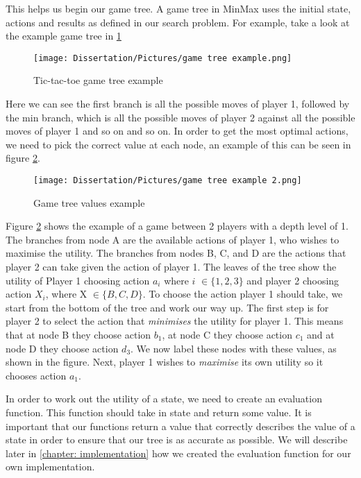 \documentclass[]{final_report}
\begin{document}
This helps us begin our game tree. A game tree in MinMax uses the initial state, actions and results as defined in our search problem. For example, take a look at the example game tree in \ref{fig:game tree example} 

\begin{figure}[!htp]
    \centering
    \texttt{[image: Dissertation/Pictures/game tree example.png]}
    \caption{Tic-tac-toe game tree example \cite{russell2016artificial}}
    \label{fig:game tree example}
\end{figure}

Here we can see the first branch is all the possible moves of player 1, followed by the min branch, which is all the possible moves of player 2 against all the possible moves of player 1 and so on and so on.  In order to get the most optimal actions, we need to pick the correct value at each node, an example of this can be seen in figure \ref{fig:game tree value example}.

\newpage
\begin{figure}[!htp]
    \centering
    \texttt{[image: Dissertation/Pictures/game tree example 2.png]}
    \caption{Game tree values example \cite{russell2016artificial}}
    \label{fig:game tree value example}
\end{figure}

Figure \ref{fig:game tree value example} shows the example of a game between 2 players with a depth level of 1. The branches from node A are the available actions of player 1, who wishes to maximise the utility. The branches from nodes B, C, and D are the actions that player 2 can take given the action of player 1. The leaves of the tree show the utility of Player 1 choosing action $a_i$ where $i$ $\in\{1, 2, 3\}$ and player 2 choosing action $X_i$, where X $\in\{ B, C, D \}$. To choose the action player 1 should take, we start from the bottom of the tree and work our way up. The first step is for player 2 to select the action that \textit{minimises} the utility for player 1. This means that at node B they choose action $b_1$, at node C they choose action $c_1$ and at node D they choose action $d_3$. We now label these nodes with these values, as shown in the figure. Next, player 1 wishes to \textit{maximise} its own utility so it chooses action $a_1$.

In order to work out the utility of a state, we need to create an evaluation function. This function should take in state and return some value. It is important that our functions return a value that correctly describes the value of a state in order to ensure that our tree is as accurate as possible. We will describe later in \ref{chapter: implementation} how we created the evaluation function for our own implementation. 
\end{document}
